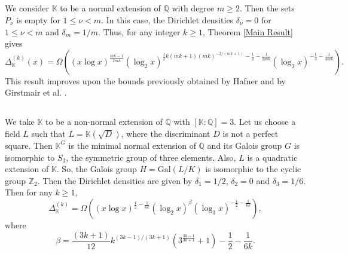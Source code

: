 \documentclass[reqno]{amsart}
\numberwithin{equation}{section}
\theoremstyle{plain}
\begin{document}
\subsection{} \label{Example 2} We consider $\mathbb{K}$ to be a normal extension of $\mathbb{Q}$ with degree $m\geq2$. Then the sets $P_{\nu}$ is empty for $1\leq \nu <m$. In this case, the Dirichlet densities  $\delta_{\nu}=0$ for $1\leq \nu <m$ and $\delta_{m}=1/m$. Thus, for any integer $k\geq 1$, Theorem \ref{Main Result} gives 
\begin{equation*}
	\Delta_{\mathbb{K}}^{(k)}(x) =\Omega\left((x\log x)^{\frac{mk-1}{2mk}} (\log_2x)^{\frac{1}{2}k(mk+1)(mk)^{-2/(mk+1)}-\frac{1}{2}-\frac{1}{2mk}} (\log_3 x)^{-\frac{1}{4}-\frac{1}{4mk}}\right).
\end{equation*}
This result improves upon the bounds previously obtained by Hafner \cite{Halfner(2)} and by Girstmair et al. \cite{GKMN}.
\subsection{} \label{Example 3} We take $\mathbb{K}$ to be a non-normal extension of $\mathbb{Q}$ with $[\mathbb{K}:\mathbb{Q}]=3$. Let us choose a field $L$ such that $L=\mathbb{K}(\sqrt{D})$, where the discriminant  $D$ is not a perfect square. Then $\mathbb{K}^G$ is the minimal normal extension of $\mathbb{Q}$ and its Galois group $G$ is isomorphic to $S_3$, the symmetric group of three elements. Also, $L$ is a quadratic extension of $\mathbb{K}$. So, the Galois group $H=\text{Gal}(L/K)$ is isomorphic to the cyclic group $\mathbb{Z}_2$. Then the Dirichlet densities are given by $\delta_1 =1/2$, $\delta_2=0$ and $\delta_3=1/6$.
Then for any $k\geq 1$, 
\begin{equation*}
	\Delta_{\mathbb{K}}^{(k)} = \Omega\left( (x\log x)^{\frac{1}{2}- \frac{1}{6k}}(\log_2 x)^{\beta}(\log_3 x)^{-\frac{1}{2}-\frac{1}{6k}}\right),
\end{equation*}
where
\begin{equation*}
	\beta = \frac{(3k+1)}{12}k^{(3k-1)/(3k+1)}\left(3^{\frac{3k-1}{3k+1}}+1\right)-\frac{1}{2}-\frac{1}{6k}.
\end{equation*}
\end{document}
